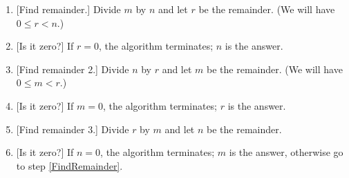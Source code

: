 \begin{enumerate}[label=\textbf{F\arabic*.},ref=F\arabic*]
	\item \label{FindRemainder} [Find remainder.] Divide $m$ by $n$ and let $r$ be the remainder. (We will have $0 \leq r < n$.)
	\item \label{IsItZero1} [Is it zero?] If $r = 0$, the algorithm terminates; $n$ is the answer.
	\item \label{FindRemainder2} [Find remainder 2.] Divide $n$ by $r$ and let $m$ be the remainder. (We will have $0 \leq m  < r$.)
	\item \label{IsItZero2} [Is it zero?] If $m = 0$, the algorithm terminates; $r$ is the answer.
	\item \label{FindRemainder3} [Find remainder 3.] Divide $r$ by $m$ and let $n$ be the remainder.
	\item \label{IsItZero3} [Is it zero?] If $n = 0$, the algorithm terminates; $m$ is the answer, 
	otherwise go to step \ref{FindRemainder}.	
\end{enumerate}